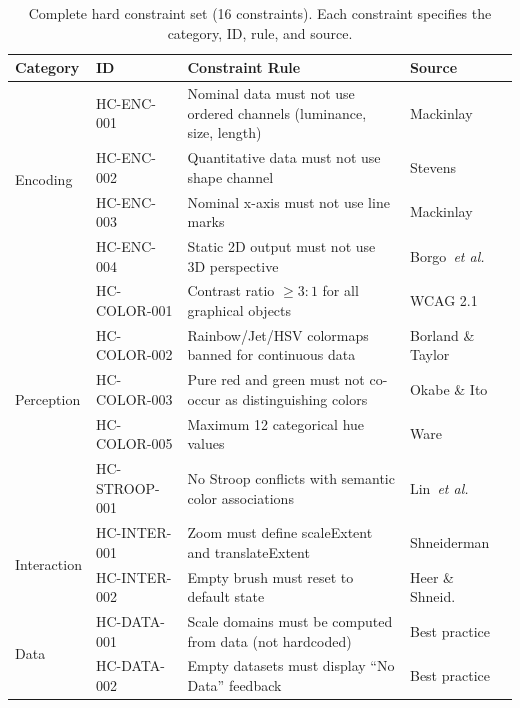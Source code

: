 \documentclass[final,5p,times,twocolumn]{elsarticle}
\newcommand{\etal}{\textit{et al.}}
\begin{document}
\begin{table}[!t]
\centering
\caption{Complete hard constraint set (16 constraints). Each constraint specifies the category, ID, rule, and source.}
\label{tab:hard_constraints}
\small
\begin{tabular}{@{}llp{8cm}l@{}}
\toprule
\textbf{Category} & \textbf{ID} & \textbf{Constraint Rule} & \textbf{Source} \\
\midrule
\multirow{4}{*}{Encoding}
 & HC-ENC-001 & Nominal data must not use ordered channels (luminance, size, length) & Mackinlay~\cite{mackinlay1986automating} \\
 & HC-ENC-002 & Quantitative data must not use shape channel & Stevens~\cite{stevens1946theory} \\
 & HC-ENC-003 & Nominal x-axis must not use line marks & Mackinlay~\cite{mackinlay1986automating} \\
 & HC-ENC-004 & Static 2D output must not use 3D perspective & Borgo~\etal{}~\cite{borgo2012glyph} \\
\midrule
\multirow{5}{*}{Perception}
 & HC-COLOR-001 & Contrast ratio $\geq 3{:}1$ for all graphical objects & WCAG 2.1 \\
 & HC-COLOR-002 & Rainbow/Jet/HSV colormaps banned for continuous data & Borland \& Taylor~\cite{borland2007rainbow} \\
 & HC-COLOR-003 & Pure red and green must not co-occur as distinguishing colors & Okabe \& Ito~\cite{okabe2008color} \\
 & HC-COLOR-005 & Maximum 12 categorical hue values & Ware~\cite{ware2004information} \\
 & HC-STROOP-001 & No Stroop conflicts with semantic color associations & Lin~\etal{}~\cite{lin2013selecting} \\
\midrule
\multirow{2}{*}{Interaction}
 & HC-INTER-001 & Zoom must define scaleExtent and translateExtent & Shneiderman~\cite{shneiderman1996eyes} \\
 & HC-INTER-002 & Empty brush must reset to default state & Heer \& Shneid.~\cite{heer2012interactive} \\
\midrule
\multirow{2}{*}{Data}
 & HC-DATA-001 & Scale domains must be computed from data (not hardcoded) & Best practice \\
 & HC-DATA-002 & Empty datasets must display ``No Data'' feedback & Best practice \\
\bottomrule
\end{tabular}
\end{table}
\end{document}
